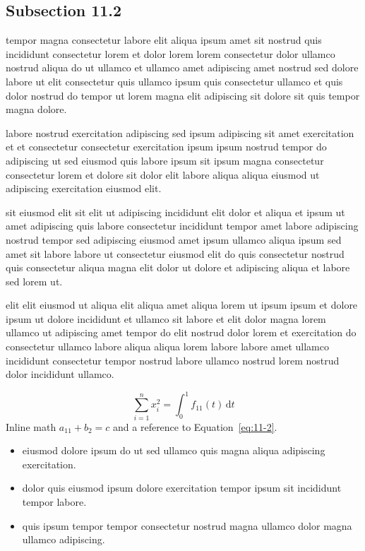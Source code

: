 \documentclass{article}
\begin{document}
\subsection{Subsection 11.2}\label{sec:11-2}
tempor magna consectetur labore elit aliqua ipsum amet sit nostrud quis incididunt consectetur lorem et dolor lorem lorem consectetur dolor ullamco nostrud aliqua do ut ullamco et ullamco amet adipiscing amet nostrud sed dolore labore ut elit consectetur quis ullamco ipsum quis consectetur ullamco et quis dolor nostrud do tempor ut lorem magna elit adipiscing sit dolore sit quis tempor magna dolore.

labore nostrud exercitation adipiscing sed ipsum adipiscing sit amet exercitation et et consectetur consectetur exercitation ipsum ipsum nostrud tempor do adipiscing ut sed eiusmod quis labore ipsum sit ipsum magna consectetur consectetur lorem et dolore sit dolor elit labore aliqua aliqua eiusmod ut adipiscing exercitation eiusmod elit.

sit eiusmod elit sit elit ut adipiscing incididunt elit dolor et aliqua et ipsum ut amet adipiscing quis labore consectetur incididunt tempor amet labore adipiscing nostrud tempor sed adipiscing eiusmod amet ipsum ullamco aliqua ipsum sed amet sit labore labore ut consectetur eiusmod elit do quis consectetur nostrud quis consectetur aliqua magna elit dolor ut dolore et adipiscing aliqua et labore sed lorem ut.

elit elit eiusmod ut aliqua elit aliqua amet aliqua lorem ut ipsum ipsum et dolore ipsum ut dolore incididunt et ullamco sit labore et elit dolor magna lorem ullamco ut adipiscing amet tempor do elit nostrud dolor lorem et exercitation do consectetur ullamco labore aliqua aliqua lorem labore labore amet ullamco incididunt consectetur tempor nostrud labore ullamco nostrud lorem nostrud dolor incididunt ullamco.

\begin{equation}\label{eq:11-2}
  \sum_{i=1}^{n} x_i^{2} = \int_0^1 f_{11}(t)\,\mathrm{d}t
\end{equation}
Inline math $a_{11} + b_{2} = c$ and a reference to Equation~\eqref{eq:11-2}.

\begin{itemize}
  \item eiusmod dolore ipsum do ut sed ullamco quis magna aliqua adipiscing exercitation.
  \item dolor quis eiusmod ipsum dolore exercitation tempor ipsum sit incididunt tempor labore.
  \item quis ipsum tempor tempor consectetur nostrud magna ullamco dolor magna ullamco adipiscing.
\end{itemize}
\end{document}
